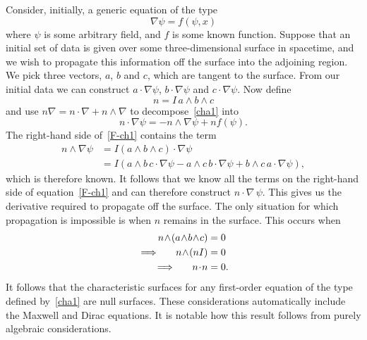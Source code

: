 \documentclass[a4paper]{article}
\numberwithin{equation}{section}
\newcommand{\hs}[1]{\hspace*{#1cm}}
\newcommand{\nn}{\nonumber}
\newcommand{\dt}{\! \cdot \!}
\newcommand{\wdg}{\! \wedge \!}
\newcommand{\eqv}{=}
\newcommand{\grad}{\nabla}
\begin{document}
Consider, initially, a generic equation of the type
%
\begin{equation}
\grad \psi = f(\psi,x)
\label{cha1}
\end{equation}
%
where $\psi$ is some arbitrary field, and $f$ is some known function.
Suppose that an initial set of data is given over some
three-dimensional surface in spacetime, and we wish to propagate this
information off the surface into the adjoining region.  We pick three
vectors, $a$, $b$ and $c$, which are tangent to the surface.  From our
initial data we can construct $a\dt\grad \psi$, $b\dt\grad \psi$ and
$c\dt\grad \psi$.  Now define
%
\begin{equation}
n \eqv I \, a \wdg b \wdg c
\end{equation}
%
and use $n\grad=n\dt\grad + n\wdg \grad$ to decompose~\eqref{cha1} into 
%
\begin{equation}
n\dt\grad \psi = - n \wdg \grad \psi + n f(\psi).
\label{F-ch1}
\end{equation}
%
The right-hand side of~\eqref{F-ch1} contains the term
%
\begin{align}
n \wdg \grad \psi 
&= I (a \wdg b \wdg c) \dt \grad \psi \nn \\
&=  I (a \wdg b \, c\dt\grad \psi - a \wdg c \, b\dt\grad \psi + b
\wdg c \, a\dt\grad \psi), 
\end{align}
%
which is therefore known.  It follows that we know all the terms on
the right-hand side of equation~\eqref{F-ch1} and can therefore construct
$n\dt\grad\,\psi$.  This gives us the derivative required to propagate
off the surface.  The only situation for which propagation is
impossible is when $n$ remains in the surface.  This occurs when
%
\begin{align}
n \wdg (a \wdg b \wdg c) &= 0 \nn \\
\implies \hs{.5} n \wdg (n I) &= 0 \nn \\
\implies \hs{.5} n \dt n &= 0.
\label{F-ch3}
\end{align}
%
It follows that the characteristic surfaces for any first-order
equation of the type defined by~\eqref{cha1} are null surfaces.  These
considerations automatically include the Maxwell and Dirac equations.
It is notable how this result follows from purely algebraic
considerations.
\end{document}
